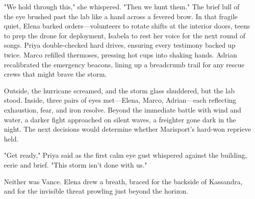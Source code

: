 "We hold through this," she whispered. "Then we hunt them." The brief lull of the eye brushed past the lab like a hand across a fevered brow. In that fragile quiet, Elena barked orders—volunteers to rotate shifts at the interior doors, teens to prep the drone for deployment, Isabela to rest her voice for the next round of songs. Priya double-checked hard drives, ensuring every testimony backed up twice. Marco refilled thermoses, pressing hot cups into shaking hands. Adrian recalibrated the emergency beacons, lining up a breadcrumb trail for any rescue crews that might brave the storm.

Outside, the hurricane screamed, and the storm glass shuddered, but the lab stood. Inside, three pairs of eyes met—Elena, Marco, Adrian—each reflecting exhaustion, fear, and iron resolve. Beyond the immediate battle with wind and water, a darker fight approached on silent waves, a freighter gone dark in the night. The next decisions would determine whether Marisport's hard-won reprieve held.

"Get ready," Priya said as the first calm eye gust whispered against the building, eerie and brief. "This storm isn't done with us."

Neither was Vance. Elena drew a breath, braced for the backside of Kassandra, and for the invisible threat prowling just beyond the horizon.
